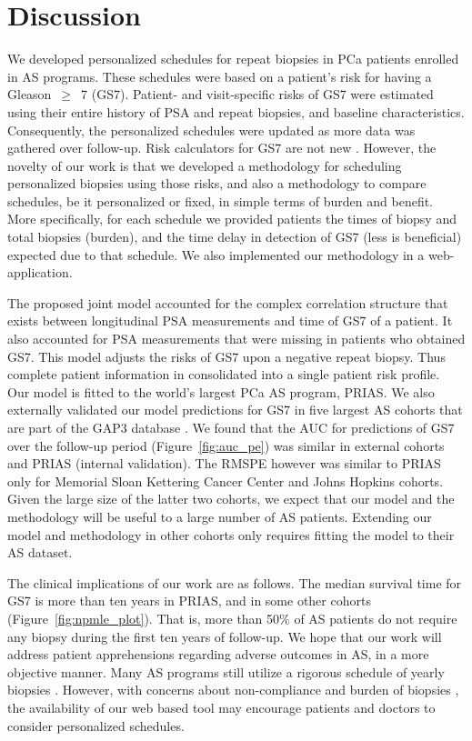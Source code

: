 \section{Discussion}
We developed personalized schedules for repeat biopsies in PCa patients enrolled in AS programs. These schedules were based on a patient's risk for having a Gleason~$\geq$~7 (GS7). Patient- and visit-specific risks of GS7 were estimated using their entire history of PSA and repeat biopsies, and baseline characteristics. Consequently, the personalized schedules were updated as more data was gathered over follow-up. Risk calculators for GS7 are not new \citep{coley2017prediction,ankerst2015precision}. However, the novelty of our work is that we developed a methodology for scheduling personalized biopsies using those risks, and also a methodology to compare schedules, be it personalized or fixed, in simple terms of burden and benefit. More specifically, for each schedule we provided patients the times of biopsy and total biopsies (burden), and the time delay in detection of GS7 (less is beneficial) expected due to that schedule. We also implemented our methodology in a web-application.

The proposed joint model accounted for the complex correlation structure that exists between longitudinal PSA measurements and time of GS7 of a patient. It also accounted for PSA measurements that were missing in patients who obtained GS7. This model adjusts the risks of GS7 upon a negative repeat biopsy. Thus complete patient information in consolidated into a single patient risk profile. Our model is fitted to the world's largest PCa AS program, PRIAS. We also externally validated our model predictions for GS7 in five largest AS cohorts that are part of the GAP3 database \citep{gap3_2018}. We found that the AUC for predictions of GS7 over the follow-up period (Figure~\ref{fig:auc_pe}) was similar in external cohorts and PRIAS (internal validation). The RMSPE however was similar to PRIAS only for Memorial Sloan Kettering Cancer Center and Johns Hopkins cohorts. Given the large size of the latter two cohorts, we expect that our model and the methodology will be useful to a large number of AS patients. Extending our model and methodology in other cohorts only requires fitting the model to their AS dataset.

The clinical implications of our work are as follows. The median survival time for GS7 is more than ten years in PRIAS, and in some other cohorts (Figure~\ref{fig:npmle_plot}). That is, more than 50\% of AS patients do not require any biopsy during the first ten years of follow-up. We hope that our work will address patient apprehensions regarding adverse outcomes in AS, in a more objective manner. Many AS programs still utilize a rigorous schedule of yearly biopsies \citep{nieboer2018active}. However, with concerns about non-compliance and burden of biopsies \citep{bokhorst2015compliance}, the availability of our web based tool may encourage patients and doctors to consider personalized schedules.

